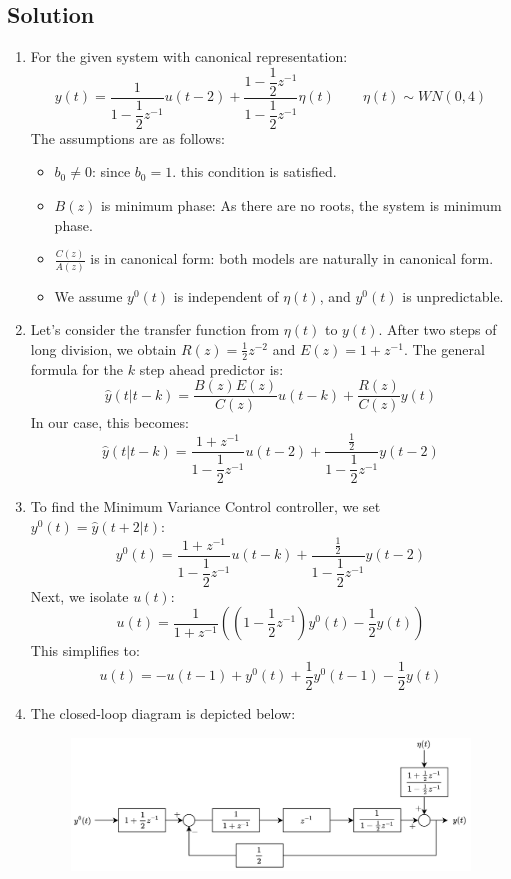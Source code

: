\subsection*{Solution}
\begin{enumerate}
    \item For the given system with canonical representation:
        \[y(t)=\dfrac{1}{1-\dfrac{1}{2}z^{-1}}u(t-2)+\dfrac{1-\dfrac{1}{2}z^{-1}}{1-\dfrac{1}{2}z^{-1}}\eta(t)\qquad \eta(t)\sim WN(0,4)\]
        The assumptions are as follows:
        \begin{itemize}
            \item $b_0\neq 0$: since $b_0=1$. this condition is satisfied. 
            \item $B(z)$ is minimum phase: As there are no roots, the system is minimum phase.
            \item $\frac{C(z)}{A(z)}$ is in canonical form: both models are naturally in canonical form.
            \item We assume $y^0(t)$ is independent of $\eta(t)$, and $y^0(t)$ is unpredictable. 
        \end{itemize}
    \item Let's consider the transfer function from $\eta(t)$ to $y(t)$. After two steps of long division, we obtain $R(z)=\frac{1}{2}z^{-2}$ and $E(z)=1+z^{-1}$. 
        The general formula for the $k$ step ahead predictor is:
        \[\hat{y}(t|t-k)=\dfrac{B(z)E(z)}{C(z)}u(t-k)+\dfrac{R(z)}{C(z)}y(t)\]
        In our case, this becomes:
        \[\hat{y}(t|t-k)=\dfrac{1+z^{-1}}{1-\dfrac{1}{2}z^{-1}}u(t-2)+\dfrac{\frac{1}{2}}{1-\dfrac{1}{2}z^{-1}}y(t-2)\]
    \item To find the Minimum Variance Control controller, we set $y^0(t)=\hat{y}(t+2|t)$:
        \[y^0(t)=\dfrac{1+z^{-1}}{1-\dfrac{1}{2}z^{-1}}u(t-k)+\dfrac{\frac{1}{2}}{1-\dfrac{1}{2}z^{-1}}y(t-2)\]
        Next, we isolate $u(t)$:
        \[u(t)=\dfrac{1}{1+z^{-1}}\left(\left(1-\dfrac{1}{2}z^{-1}\right)y^0(t)-\dfrac{1}{2}y(t)\right)\]
        This simplifies to:
        \[u(t)=-u(t-1)+y^0(t)+\dfrac{1}{2}y^0(t-1)-\dfrac{1}{2}y(t)\]
    \item The closed-loop diagram is depicted below:
        \begin{figure}[H]
            \centering
            \includegraphics[width=0.75\linewidth]{images/ex3.png}

\end{figure}
\end{enumerate}
